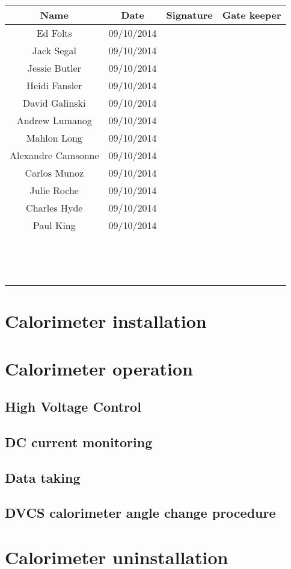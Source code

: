 \documentclass{article}
\begin{document}
\begin{tabular}{|c|c|c|c|}
\hline
Name & Date & Signature & Gate keeper\\
\hline
Ed Folts & 09/10/2014 & &\\
\hline
Jack Segal & 09/10/2014 & &\\
\hline
Jessie Butler & 09/10/2014 & &\\
\hline
Heidi Fansler& 09/10/2014 & &\\
\hline
David Galinski& 09/10/2014 & &\\
\hline
Andrew Lumanog& 09/10/2014 & &\\
\hline
Mahlon Long & 09/10/2014 & &\\
\hline
Alexandre Camsonne & 09/10/2014 & &\\
\hline
Carlos Munoz & 09/10/2014 & &\\
\hline
Julie Roche & 09/10/2014 & &\\
\hline
Charles Hyde & 09/10/2014 & &\\
\hline
Paul King  & 09/10/2014 & &\\
\hline
  &  & &\\
\hline
  & & &\\
\hline
  &  & &\\
\hline
  &  & &\\
\hline
  &  & &\\
\hline
  &  & &\\
\hline
  &  & &\\
\hline
  &  & &\\
\hline
  & & &\\
\hline
  &  & &\\
\hline
  &  & &\\
\hline
  &  & &\\
\hline
  &  & &\\
\hline
  &  & &\\
\hline
\end{tabular}

\section{Calorimeter installation}

\section{Calorimeter operation}
\subsection{High Voltage Control}
\subsection{DC current monitoring}
\subsection{Data taking}
\subsection{DVCS calorimeter angle change procedure}
\section{Calorimeter uninstallation}
\end{document}
